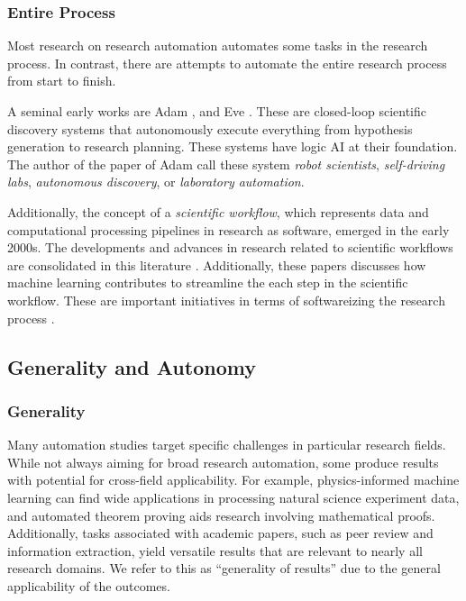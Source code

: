 \subsubsection{Entire Process}
Most research on research automation automates some tasks in the research process. In contrast, there are attempts to automate the entire research process from start to finish.

A seminal early works are Adam \cite{king2004functional}, and Eve \cite{williams2015cheaper}. These are closed-loop scientific discovery systems that autonomously execute everything from hypothesis generation to research planning. These systems have logic AI at their foundation. The author of the paper of Adam call these system \textit{robot scientists}, \textit{self-driving labs}, \textit{autonomous discovery}, or \textit{laboratory automation}.

Additionally, the concept of a \textit{scientific workflow}, which represents data and computational processing pipelines in research as software, emerged in the early 2000s. The developments and advances in research related to scientific workflows are consolidated in this literature \cite{barker2008scientific,atkinson2017scientific}. Additionally, these papers \cite{deelman2019role,nouri2021exploring} discusses how machine learning contributes to streamline the each step in the scientific workflow. These are important initiatives in terms of softwareizing the research process \cite{deelman2015pegasus,gil2011semantic}.

\subsection{Generality and Autonomy}

\subsubsection{Generality}
Many automation studies target specific challenges in particular research fields. While not always aiming for broad research automation, some produce results with potential for cross-field applicability. For example, physics-informed machine learning can find wide applications in processing natural science experiment data, and automated theorem proving aids research involving mathematical proofs. Additionally, tasks associated with academic papers, such as peer review and information extraction, yield versatile results that are relevant to nearly all research domains. We refer to this as ``generality of results'' due to the general applicability of the outcomes.

